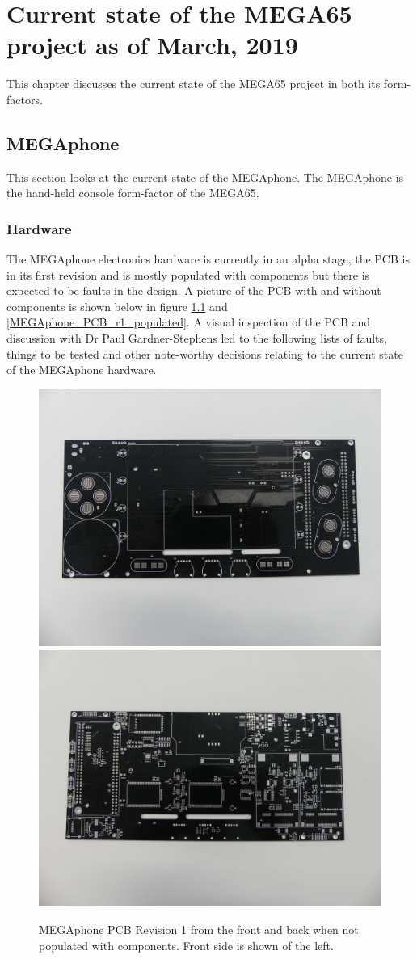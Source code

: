 
\chapter{Current state of the MEGA65 project as of March, 2019}
\label{cha: Chapter5}
This chapter discusses the current state of the MEGA65 project in both its form-factors. 
\section{MEGAphone}
This section looks at the current state of the MEGAphone. The MEGAphone is the hand-held console form-factor of the MEGA65. 

\subsection{Hardware}
The MEGAphone electronics hardware is currently in an alpha stage, the PCB is in its first revision and is mostly populated with components but there is expected to be faults in the design. A picture of the PCB with and without components is shown below in figure \ref{MEGAphone_PCB_r1_empty} and \ref{MEGAphone_PCB_r1_populated}. A visual inspection of the PCB and discussion with Dr Paul Gardner-Stephens led to the following lists of faults, things to be tested and other note-worthy decisions relating to the current state of the MEGAphone hardware. \\

\begin{figure} \begin{center}
\includegraphics[width=.3\linewidth]{pics/MEGAphone_PCB_r1_empty_front} 
\includegraphics[width=.3\linewidth]{pics/MEGAphone_PCB_r1_empty_back} 
\end{center} 
\caption{MEGAphone PCB Revision 1 from the front and back when not populated with components. Front side is shown of the left.\\}
\label{MEGAphone_PCB_r1_empty}
\end{figure}

